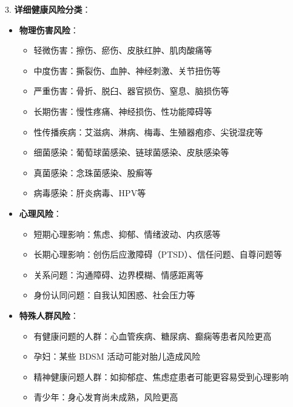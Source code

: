 \documentclass[12pt,UTF8]{ctexbook}
\begin{document}
3. \textbf{详细健康风险分类}：
  \begin{itemize}
  \item \textbf{物理伤害风险}：
    \begin{itemize}
    \item 轻微伤害：擦伤、瘀伤、皮肤红肿、肌肉酸痛等
    \item 中度伤害：撕裂伤、血肿、神经刺激、关节扭伤等
    \item 严重伤害：骨折、脱臼、器官损伤、窒息、脑损伤等
    \item 长期伤害：慢性疼痛、神经损伤、性功能障碍等
    \end{itemize}
    \begin{itemize}
    \item 性传播疾病：艾滋病、淋病、梅毒、生殖器疱疹、尖锐湿疣等
    \item 细菌感染：葡萄球菌感染、链球菌感染、皮肤感染等
    \item 真菌感染：念珠菌感染、股癣等
    \item 病毒感染：肝炎病毒、HPV等
    \end{itemize}
  \item \textbf{心理风险}：
    \begin{itemize}
    \item 短期心理影响：焦虑、抑郁、情绪波动、内疚感等
    \item 长期心理影响：创伤后应激障碍（PTSD）、信任问题、自尊问题等
    \item 关系问题：沟通障碍、边界模糊、情感距离等
    \item 身份认同问题：自我认知困惑、社会压力等
    \end{itemize}
  \item \textbf{特殊人群风险}：
    \begin{itemize}
    \item 有健康问题的人群：心血管疾病、糖尿病、癫痫等患者风险更高
    \item 孕妇：某些 BDSM 活动可能对胎儿造成风险
    \item 精神健康问题人群：如抑郁症、焦虑症患者可能更容易受到心理影响
    \item 青少年：身心发育尚未成熟，风险更高
    \end{itemize}
  \end{itemize}
\end{document}
